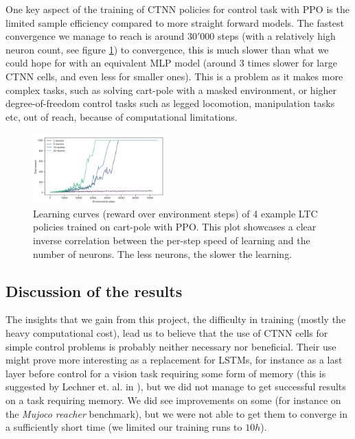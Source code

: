 One key aspect of the training of CTNN policies for control task with PPO is the limited sample efficiency compared to more straight forward models. The fastest convergence we manage to reach is around $30'000$ steps (with a relatively high neuron count, see figure \ref{fig:speed_count}) to convergence, this is much slower than what we could hope for with an equivalent MLP model (around 3 times slower for large CTNN cells, and even less for smaller ones). This is a problem as it makes more complex tasks, such as solving cart-pole with a masked environment, or higher degree-of-freedom control tasks such as legged locomotion, manipulation tasks etc, out of reach, because of computational limitations.

\begin{figure}[h!]
    \centering
    \includegraphics[width=0.45\textwidth]{figures/convergence_rate.png}
    \caption{Learning curves (reward over environment steps) of 4 example LTC policies trained on cart-pole with PPO. This plot showcases a clear inverse correlation between the per-step speed of learning and the number of neurons. The less neurons, the slower the learning.}
    \label{fig:speed_count}
\end{figure}



\subsection{Discussion of the results}
The insights that we gain from this project, the difficulty in training (mostly the heavy computational cost), lead us to believe that the use of CTNN cells for simple control problems is probably neither necessary nor beneficial. Their use might prove more interesting as a replacement for LSTMs, for instance as a last layer before control for a vision task requiring some form of memory (this is suggested by Lechner et. al. in \cite{Lechner2020NeuralCP}), but we did not manage to get successful results on a task requiring memory. We did see improvements on some (for instance on the \textit{Mujoco reacher} benchmark), but we were not able to get them to converge in a sufficiently short time (we limited our training runs to $10h$). \\


